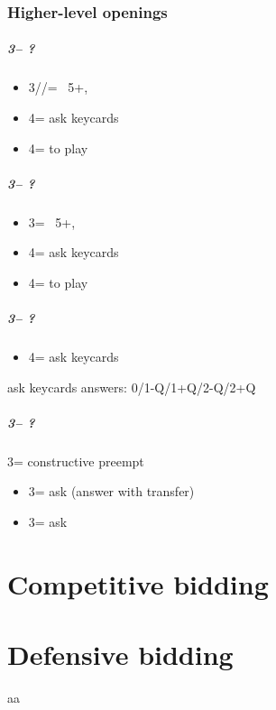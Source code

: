\documentclass[12pt, a4paper]{report}
\begin{document}
\section*{\colorbox{blue!30}{Higher-level openings}}
 {
    \subsubsection*{3\clubs -- ?}
    \begin{itemize}
        \item 3\diams/\hearts/\spades = \nat\ 5+, \gf
        \item 4\diams = ask keycards
        \item 4\major = to play
    \end{itemize}

    \subsubsection*{3\diams -- ?}
    \begin{itemize}
        \item 3\major = \nat\ 5+, \gf
        \item 4\clubs = ask keycards
        \item 4\major = to play
    \end{itemize}

    \subsubsection*{3\major -- ?}
    \begin{itemize}
        \item 4\clubs = ask keycards
    \end{itemize}

    \vspace{0.5cm}
    ask keycards answers: 0/1-Q/1+Q/2-Q/2+Q
    \vspace{0.4cm}

    \subsubsection*{3\nt -- ?}
    3\nt = constructive \major preempt
    \begin{itemize}
        \item 3\clubs = ask (answer with transfer)
        \item 3\diams = ask
    \end{itemize}
}

\part*{\colorbox{RoyalPurple!30}{Competitive bidding}}

\part*{\colorbox{RoyalPurple!30}{Defensive bidding}}

aa
\end{document}

